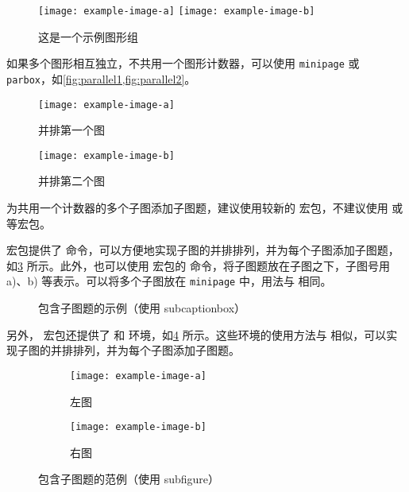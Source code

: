 \begin{figure}[!htb]
  \centering
  \texttt{[image: example-image-a]}
  \hspace{1cm}
  \texttt{[image: example-image-b]}
  \caption{这是一个示例图形组}
  \label{fig:example-subfig-1}
\end{figure}

如果多个图形相互独立，不共用一个图形计数器，可以使用 \texttt{minipage} 或 \texttt{parbox}，如\cref{fig:parallel1,fig:parallel2}。

\begin{figure}[!htb]
  \begin{minipage}{0.4\textwidth}
    \centering
    \texttt{[image: example-image-a]}
    \caption{并排第一个图}
    \label{fig:parallel1}
  \end{minipage}\hfill
  \begin{minipage}{0.4\textwidth}
    \centering
    \texttt{[image: example-image-b]}
    \caption{并排第二个图}
    \label{fig:parallel2}
  \end{minipage}
\end{figure}

为共用一个计数器的多个子图添加子图题，建议使用较新的  宏包，不建议使用  或  等宏包。

 宏包提供了  命令，可以方便地实现子图的并排排列，并为每个子图添加子图题，如\cref{fig:subcaptionbox} 所示。此外，也可以使用  宏包的  命令，将子图题放在子图之下，子图号用 a)、b) 等表示。可以将多个子图放在 \texttt{minipage} 中，用法与  相同。

\begin{figure}[!htb]
  \centering
  \hspace{1cm}
  \caption{包含子图题的示例（使用 subcaptionbox）}
  \label{fig:subcaptionbox}
\end{figure}

另外， 宏包还提供了  和  环境，如\cref{fig:subfigure} 所示。这些环境的使用方法与  相似，可以实现子图的并排排列，并为每个子图添加子图题。

\begin{figure}[!htb]
  \centering
  \begin{subfigure}{0.3\textwidth}
    \centering
    \texttt{[image: example-image-a]}
    \caption{左图}
  \end{subfigure}
  \hspace{1cm}
  \begin{subfigure}{0.4\textwidth}
    \centering
    \texttt{[image: example-image-b]}
    \caption{右图}
  \end{subfigure}
  \caption{包含子图题的范例（使用 subfigure）}
  \label{fig:subfigure}
\end{figure}



